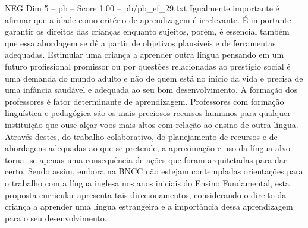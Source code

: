 \begin{textsample}{NEG Dim 5 – pb – Score 1.00 – pb/pb\_ef\_29.txt}
Igualmente importante é afirmar que a idade como critério de aprendizagem é irrelevante.
É importante garantir os direitos das crianças enquanto sujeitos, porém, é essencial também que essa abordagem se dê a partir de objetivos plausíveis e de ferramentas adequadas.
Estimular uma criança a aprender outra língua pensando em um futuro profissional promissor ou por questões relacionadas ao prestígio social é uma demanda do mundo adulto e não de quem está no início da vida e precisa de uma infância saudável e adequada ao seu bom desenvolvimento.
A formação dos professores é fator determinante de aprendizagem.
Professores com formação linguística e pedagógica são os mais preciosos recursos humanos para qualquer instituição que ouse alçar voos mais altos com relação ao ensino de outra língua.
Através destes, do trabalho colaborativo, do planejamento de recursos e de abordagens adequadas ao que se pretende, a aproximação e uso da língua alvo torna -se apenas uma consequência de ações que foram arquitetadas para dar certo.
Sendo assim, embora na BNCC não estejam contempladas orientações para o trabalho com a língua inglesa nos anos iniciais do Ensino Fundamental, esta proposta curricular apresenta tais direcionamentos, considerando o direito da criança a aprender uma língua estrangeira e a importância dessa aprendizagem para o seu desenvolvimento.

\end{textsample}
